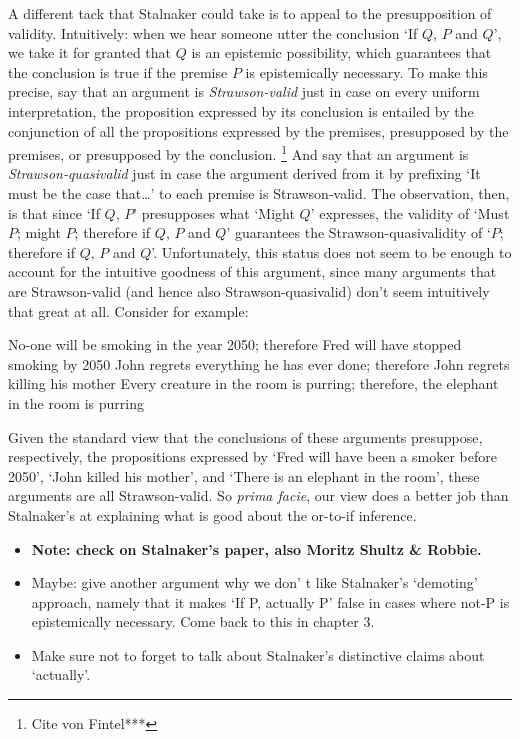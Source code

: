 \documentclass[If.tex]{subfiles}
\begin{document}
\begin{prop}
A different tack that Stalnaker could take is to appeal to the presupposition of validity.  Intuitively: when we hear someone utter the conclusion ‘If $Q$, $P$ and $Q$’, we take it for granted that $Q$ is an epistemic possibility, which guarantees that the conclusion is true if the premise $P$ is epistemically necessary.  To make this precise, say that an argument is \emph{Strawson-valid} just in case on every uniform interpretation, the proposition expressed by its conclusion is entailed by the conjunction of all the propositions expressed by the premises, presupposed by the premises, or presupposed by the conclusion.%
\footnote{Cite von Fintel***}  
And say that an argument is \emph{Strawson-quasivalid} just in case the argument derived from it by prefixing ‘It must be the case that…’ to each premise is Strawson-valid.  The observation, then, is that since ‘If $Q$, $P$’ presupposes what ‘Might $Q$’ expresses, the validity of ‘Must $P$; might $P$; therefore if $Q$, $P$ and $Q$’ guarantees the Strawson-quasivalidity of ‘$P$; therefore if $Q$, $P$ and $Q$’.  Unfortunately, this status does not seem to be enough to account for the intuitive goodness of this argument, since many arguments that are Strawson-valid (and hence also Strawson-quasivalid) don't seem intuitively that great at all.  Consider for example:
\begin{prop}
	\nitem 
	No-one will be smoking in the year 2050; therefore Fred will have stopped smoking by 2050
	\nitem 
	John regrets everything he has ever done; therefore John regrets killing his mother
	\nitem 
	Every creature in the room is purring; therefore, the elephant in the room is purring
\end{prop}
Given the standard view that the conclusions of these arguments presuppose, respectively, the propositions expressed by ‘Fred will have been a smoker before 2050’, ‘John killed his mother’, and ‘There is an elephant in the room’, these arguments are all Strawson-valid.  So \emph{prima facie}, our view does a better job than Stalnaker's at explaining what is good about the or-to-if inference.

\begin{itemize}
	\item
	\textbf{Note: check on Stalnaker's paper, also Moritz Shultz \& Robbie.}
	\item
	Maybe: give another argument why we don' t like Stalnaker's ‘demoting’ approach, namely that it makes ‘If P, actually P’ false in cases where not-P is epistemically necessary. Come back to this in chapter 3. 
	\item
	Make sure not to forget to talk about Stalnaker's distinctive claims about ‘actually’. 
\end{itemize}


\end{prop}
\end{document}
